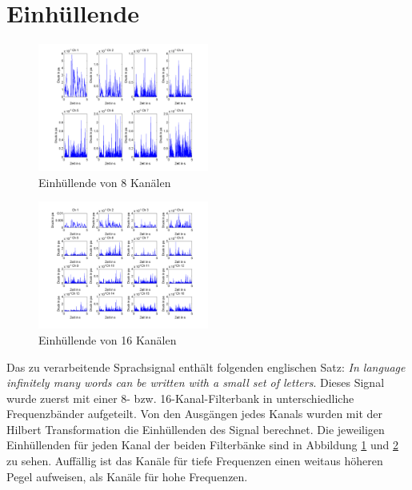 \documentclass[conference]{IEEEtran}
\begin{document}
\section{Einhüllende}
\begin{compactenum}[a)]
\begin{figure}[h!]
	\vspace{-5pt}
	\centering
	\includegraphics[width=0.5\textwidth]{img/env8.png}
	\vspace{-10pt}
	\caption{Einhüllende von 8 Kanälen}
	\vspace{-10pt}
	\label{fig:env8}
\end{figure}

\begin{figure}[h!]
	\vspace{-5pt}
	\centering
	\includegraphics[width=0.5\textwidth]{img/env16.png}
	\vspace{-10pt}
	\caption{Einhüllende von 16 Kanälen}
	\vspace{-10pt}
	\label{fig:env16}
\end{figure}
\item Das zu verarbeitende Sprachsignal enthält folgenden englischen Satz: \textit{In language infinitely many words can be written with a small set of letters}. Dieses Signal wurde zuerst mit einer 8- bzw. 16-Kanal-Filterbank in unterschiedliche Frequenzbänder aufgeteilt. Von den Ausgängen jedes Kanals wurden mit der Hilbert Transformation die Einhüllenden des Signal berechnet. Die jeweiligen Einhüllenden für jeden Kanal der beiden Filterbänke sind in Abbildung \ref{fig:env8} und \ref{fig:env16} zu sehen. Auffällig ist das Kanäle für tiefe Frequenzen einen weitaus höheren Pegel aufweisen, als Kanäle für hohe Frequenzen. 


\end{compactenum}
\end{document}
